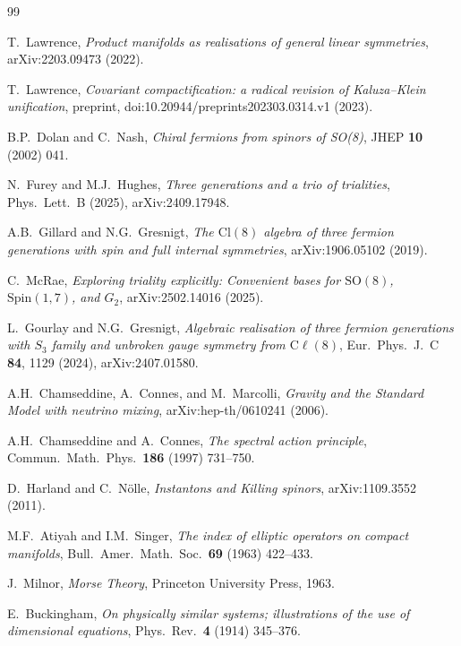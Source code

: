 \documentclass[12pt,a4paper]{article}
\begin{document}

\begin{thebibliography}{99}

T.~Lawrence,
\textit{Product manifolds as realisations of general linear symmetries},
arXiv:2203.09473 (2022).

T.~Lawrence,
\textit{Covariant compactification: a radical revision of Kaluza--Klein unification},
preprint, doi:10.20944/preprints202303.0314.v1 (2023).

B.P.~Dolan and C.~Nash,
\textit{Chiral fermions from spinors of SO(8)},
JHEP \textbf{10} (2002) 041.

N.~Furey and M.J.~Hughes,
\textit{Three generations and a trio of trialities},
Phys.\ Lett.\ B (2025), arXiv:2409.17948.

A.B.~Gillard and N.G.~Gresnigt,
\textit{The $\mathrm{Cl}(8)$ algebra of three fermion generations with spin and full internal symmetries},
arXiv:1906.05102 (2019).

C.~McRae,
\textit{Exploring triality explicitly: Convenient bases for $\mathrm{SO}(8)$, $\mathrm{Spin}(1,7)$, and $G_2$},
arXiv:2502.14016 (2025).

L.~Gourlay and N.G.~Gresnigt,
\textit{Algebraic realisation of three fermion generations with $S_3$ family and unbroken gauge symmetry from $\mathrm{C}\ell(8)$},
Eur.\ Phys.\ J.\ C \textbf{84}, 1129 (2024), arXiv:2407.01580.

A.H.~Chamseddine, A.~Connes, and M.~Marcolli,
\textit{Gravity and the Standard Model with neutrino mixing},
arXiv:hep-th/0610241 (2006).

A.H.~Chamseddine and A.~Connes,
\textit{The spectral action principle},
Commun.\ Math.\ Phys.\ \textbf{186} (1997) 731--750.

D.~Harland and C.~N\"olle,
\textit{Instantons and Killing spinors},
arXiv:1109.3552 (2011).

M.F.~Atiyah and I.M.~Singer,
\textit{The index of elliptic operators on compact manifolds},
Bull.\ Amer.\ Math.\ Soc.\ \textbf{69} (1963) 422--433.

J.~Milnor,
\textit{Morse Theory},
Princeton University Press, 1963.

E.~Buckingham,
\textit{On physically similar systems; illustrations of the use of dimensional equations},
Phys.\ Rev.\ \textbf{4} (1914) 345--376.


\end{thebibliography}
\end{document}
